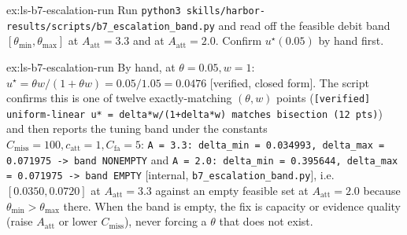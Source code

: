 \documentclass[11pt,a4paper]{article}
\theoremstyle{definition}
\theoremstyle{plain}
\begin{document}
\begin{pdexercise}[kind=Trace,rating=2]{ex:ls-b7-escalation-run}
Run \texttt{python3 skills/harbor-results/scripts/b7\_escalation\_band.py} and read
off the feasible debit band $[\theta_{\min},\theta_{\max}]$ at $A_{\mathrm{att}}=3.3$ and at
$A_{\mathrm{att}}=2.0$. Confirm $u^\star(0.05)$ by hand first.
\end{pdexercise}
\begin{pdsolution}{ex:ls-b7-escalation-run}
By hand, at $\theta=0.05,w=1$: $u^\star=\theta w/(1+\theta w)=0.05/1.05=0.0476$ [verified, closed form]. The script confirms this is one of twelve exactly-matching $(\theta,w)$ points (\texttt{[verified] uniform-linear u* = delta*w\allowbreak/(1+delta*w) matches bisection (12 pts)}) and then reports the tuning band under the constants $C_{\mathrm{miss}}=100,c_{\mathrm{att}}=1,C_{\mathrm{fa}}=5$: \texttt{A = 3.3: delta\_min = 0.034993, delta\_max = \mbox{0.071975} -> band NONEMPTY} and \texttt{A = 2.0: delta\_min = 0.395644, delta\_max = \mbox{0.071975} -> band EMPTY} [internal, \texttt{b7\allowbreak\_escalation\allowbreak\_band.py}], i.e.\ $[0.0350,0.0720]$ at $A_{\mathrm{att}}=3.3$ against an empty feasible set at $A_{\mathrm{att}}=2.0$ because $\theta_{\min}>\theta_{\max}$ there. When the band is empty, the fix is capacity or evidence quality (raise $A_{\mathrm{att}}$ or lower $C_{\mathrm{miss}}$), never forcing a $\theta$ that does not exist.
\end{pdsolution}

\end{document}
